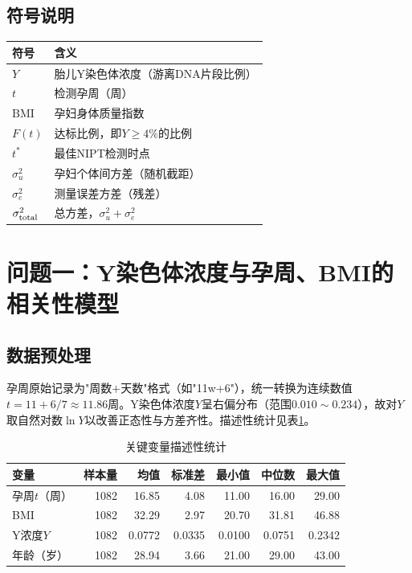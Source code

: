\documentclass[12pt]{ctexart}
\begin{document}
\subsection{符号说明}
\begin{center}
\begin{tabular}{ll}
\toprule
符号 & 含义 \\
\midrule
$Y$ & 胎儿Y染色体浓度（游离DNA片段比例） \\
$t$ & 检测孕周（周） \\
$\mathrm{BMI}$ & 孕妇身体质量指数 \\
$F(t)$ & 达标比例，即$Y\ge4\%$的比例 \\
$t^*$ & 最佳NIPT检测时点 \\
$\sigma_u^2$ & 孕妇个体间方差（随机截距） \\
$\sigma_e^2$ & 测量误差方差（残差） \\
$\sigma_{\rm total}^2$ & 总方差，$\sigma_u^2+\sigma_e^2$ \\
\bottomrule
\end{tabular}
\end{center}

\section{问题一：Y染色体浓度与孕周、BMI的相关性模型}

\subsection{数据预处理}

孕周原始记录为"周数$+$天数"格式（如"11w+6"），统一转换为连续数值$t=11+6/7\approx11.86$周。Y染色体浓度$Y$呈右偏分布（范围$0.010\sim0.234$），故对$Y$取自然对数$\ln Y$以改善正态性与方差齐性。描述性统计见表\ref{tab:desc}。

\begin{table}[H]
\centering
\caption{关键变量描述性统计}
\label{tab:desc}
\begin{tabular}{lrrrrrr}
\toprule
变量 & 样本量 & 均值 & 标准差 & 最小值 & 中位数 & 最大值 \\
\midrule
孕周$t$（周） & 1082 & 16.85 & 4.08 & 11.00 & 16.00 & 29.00 \\
BMI & 1082 & 32.29 & 2.97 & 20.70 & 31.81 & 46.88 \\
Y浓度$Y$ & 1082 & 0.0772 & 0.0335 & 0.0100 & 0.0751 & 0.2342 \\
年龄（岁） & 1082 & 28.94 & 3.66 & 21.00 & 29.00 & 43.00 \\
\bottomrule
\end{tabular}
\end{table}
\end{document}
